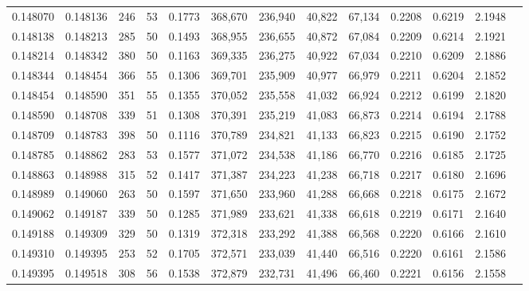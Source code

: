 \begin{tabular}{rrrrrrrrrrrrr}
0.148070 & 0.148136 &   246 &  53 &                                     0.1773 & 368,670 & 236,940 &  40,822 &  67,134 & 0.2208 & 0.6219 & 2.1948 \\
0.148138 & 0.148213 &   285 &  50 &                                     0.1493 & 368,955 & 236,655 &  40,872 &  67,084 & 0.2209 & 0.6214 & 2.1921 \\
0.148214 & 0.148342 &   380 &  50 &                                     0.1163 & 369,335 & 236,275 &  40,922 &  67,034 & 0.2210 & 0.6209 & 2.1886 \\
0.148344 & 0.148454 &   366 &  55 &                                     0.1306 & 369,701 & 235,909 &  40,977 &  66,979 & 0.2211 & 0.6204 & 2.1852 \\
0.148454 & 0.148590 &   351 &  55 &                                     0.1355 & 370,052 & 235,558 &  41,032 &  66,924 & 0.2212 & 0.6199 & 2.1820 \\
0.148590 & 0.148708 &   339 &  51 &                                     0.1308 & 370,391 & 235,219 &  41,083 &  66,873 & 0.2214 & 0.6194 & 2.1788 \\
0.148709 & 0.148783 &   398 &  50 &                                     0.1116 & 370,789 & 234,821 &  41,133 &  66,823 & 0.2215 & 0.6190 & 2.1752 \\
0.148785 & 0.148862 &   283 &  53 &                                     0.1577 & 371,072 & 234,538 &  41,186 &  66,770 & 0.2216 & 0.6185 & 2.1725 \\
0.148863 & 0.148988 &   315 &  52 &                                     0.1417 & 371,387 & 234,223 &  41,238 &  66,718 & 0.2217 & 0.6180 & 2.1696 \\
0.148989 & 0.149060 &   263 &  50 &                                     0.1597 & 371,650 & 233,960 &  41,288 &  66,668 & 0.2218 & 0.6175 & 2.1672 \\
0.149062 & 0.149187 &   339 &  50 &                                     0.1285 & 371,989 & 233,621 &  41,338 &  66,618 & 0.2219 & 0.6171 & 2.1640 \\
0.149188 & 0.149309 &   329 &  50 &                                     0.1319 & 372,318 & 233,292 &  41,388 &  66,568 & 0.2220 & 0.6166 & 2.1610 \\
0.149310 & 0.149395 &   253 &  52 &                                     0.1705 & 372,571 & 233,039 &  41,440 &  66,516 & 0.2220 & 0.6161 & 2.1586 \\
0.149395 & 0.149518 &   308 &  56 &                                     0.1538 & 372,879 & 232,731 &  41,496 &  66,460 & 0.2221 & 0.6156 & 2.1558 \\

\end{tabular}
